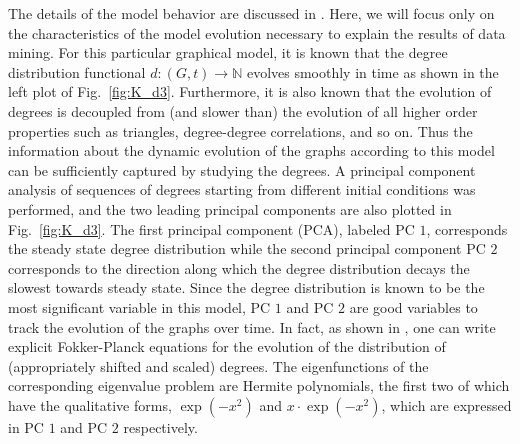 % 
The details of the model behavior are discussed in
\cite{bold_equation-free_2014}.
% 
Here, we will focus only on the characteristics of the model evolution
necessary to explain the results of data mining.
% 
For this particular graphical model, it is known that the degree
distribution functional $d: (G,t) \rightarrow \mathbb{N}$ evolves
smoothly in time as shown in the left plot of Fig.~\ref{fig:K_d3}.
% 
Furthermore, it is also known that the evolution of degrees is
decoupled from (and slower than) the evolution of all higher order
properties such as triangles, degree-degree correlations, and so on.
% 
Thus the information about the dynamic evolution of the graphs
according to this model can be sufficiently captured by studying the
degrees.
% 
A principal component analysis of sequences of degrees starting from
different initial conditions was performed, and the two leading
principal components are also plotted in Fig.~\ref{fig:K_d3}.
% 
The first principal component (PCA), labeled PC $1$, corresponds the
steady state degree distribution while the second principal component
PC $2$ corresponds to the direction along which the degree
distribution decays the slowest towards steady state.
% 
Since the degree distribution is known to be the most significant
variable in this model, PC $1$ and PC $2$ are good variables to track
the evolution of the graphs over time.
% 
In fact, as shown in \cite{bold_equation-free_2014}, one can write explicit
Fokker-Planck equations for the evolution of the distribution of
(appropriately shifted and scaled) degrees.
% 
The eigenfunctions of the corresponding eigenvalue problem are Hermite
polynomials, the first two of which have the qualitative forms,
$\exp(-x^2)$ and $x \cdot \exp(-x^2)$, which are expressed in PC $1$
and PC $2$ respectively.
% 


